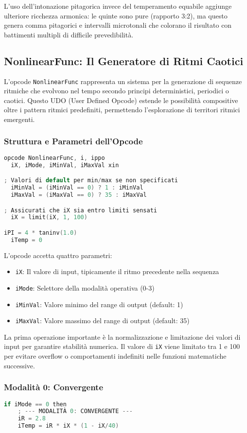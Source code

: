 L'uso dell'intonazione pitagorica invece del temperamento equabile aggiunge ulteriore ricchezza armonica: le quinte sono pure (rapporto 3:2), ma questo genera comma pitagorici e intervalli microtonali che colorano il risultato con battimenti multipli di difficile prevedibilità.
\subsection{NonlinearFunc: Il Generatore di Ritmi Caotici}
L'opcode \texttt{NonlinearFunc} rappresenta un sistema per la generazione di sequenze ritmiche che evolvono nel tempo secondo principi deterministici, periodici o caotici. Questo UDO (User Defined Opcode) estende le possibilità compositive oltre i pattern ritmici predefiniti, permettendo l'esplorazione di territori ritmici emergenti.
\subsubsection{Struttura e Parametri dell'Opcode}
\begin{lstlisting}[language=C]
opcode NonlinearFunc, i, ippo
  iX, iMode, iMinVal, iMaxVal xin

; Valori di default per min/max se non specificati
  iMinVal = (iMinVal == 0) ? 1 : iMinVal
  iMaxVal = (iMaxVal == 0) ? 35 : iMaxVal

; Assicurati che iX sia entro limiti sensati
  iX = limit(iX, 1, 100)

iPI = 4 * taninv(1.0)  
  iTemp = 0
\end{lstlisting}

L'opcode accetta quattro parametri:
\begin{itemize}
 \item \texttt{iX}: Il valore di input, tipicamente il ritmo precedente nella sequenza
 \item \texttt{iMode}: Selettore della modalità operativa (0-3)
 \item \texttt{iMinVal}: Valore minimo del range di output (default: 1)
 \item \texttt{iMaxVal}: Valore massimo del range di output (default: 35)
\end{itemize}

La prima operazione importante è la normalizzazione e limitazione dei valori di input per garantire stabilità numerica. Il valore di \texttt{iX} viene limitato tra 1 e 100 per evitare overflow o comportamenti indefiniti nelle funzioni matematiche successive.
\subsubsection{Modalità 0: Convergente}
\begin{lstlisting}[language=C]
if iMode == 0 then
    ; --- MODALITÀ 0: CONVERGENTE ---
    iR = 2.8
    iTemp = iR * iX * (1 - iX/40)
\end{lstlisting}

